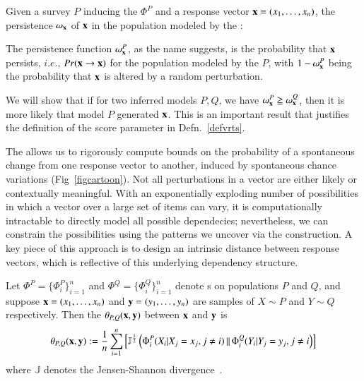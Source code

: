 \documentclass[onecolumn,10pt]{IEEEtran}
\begin{document}
% 
\begin{defn}\label{def:mem}
  Given a survey $P$ inducing the \qnet $\Phi^P$ and a response  vector $\bm{\mathrm{x}} = (x_1, \ldots, x_n)$, the persistence $\omega_{\bm{\mathrm{x}}}$ of  $\bm{\mathrm{x}}$ in the population modeled  by the \qnet:
\end{defn}
The persistence function $\omega_{\bm{\mathrm{x}}}^P$, as the name suggests,  is the probability that $\bm{\mathrm{x}}$ persists, $i.e.$,  $Pr(\bm{\mathrm{x}} \rightarrow \bm{\mathrm{x}})$ for the population modeled by the \qnet $P$, with $1-\omega_{\bm{\mathrm{x}}}^P$ being the probability that $\bm{\mathrm{x}}$ is altered by a  random perturbation.

We will show  that if for two inferred \qnet models $P,Q$, we have $\omega_{\bm{\mathrm{x}}}^P \geqq \omega_{\bm{\mathrm{x}}}^Q$, then it is more likely that model $P$ generated $\bm{\mathrm{x}}$. This is an important result that justifies the definition of the
score parameter in Defn.~\ref{defvrts}.



The \qnet allows us to rigorously compute  bounds on  the probability of a spontaneous change from one response vector to another, induced by spontaneous chance variations (Fig~\ref{figcartoon}). Not all perturbations in a vector are either likely or contextually meaningful. With an exponentially exploding number of possibilities in which a vector over a large set of items can vary, it is computationally intractable to directly model all possible dependecies; nevertheless, we can constrain the possibilities using the patterns we uncover via the \qnet construction.  A key piece of this approach is to design  an intrinsic distance between response vectors, which is reflective of this underlying  dependency structure.  

\begin{defn}[\qdist]
  \label{defqdistance} 
  Let $\Phi^P = \{\Phi_i^P\}_{i=1}^n$ and $\Phi^Q = \{\Phi_i^Q\}_{i=1}^n$ denote {\qnet}s on populations $P$ and $Q$, and suppose $\bm{\mathrm{x}}=(x_1, \ldots, x_n)$ and $\bm{\mathrm{y}} =(y_1, \ldots, y_n)$ are samples of $X \sim P$ and $Y \sim Q$ respectively. Then the \qdist $\theta_{P,Q}(\bm{\mathrm{x}},\bm{\mathrm{y}})$ between $\bm{\mathrm{x}}$ and $\bm{\mathrm{y}}$ is\[\theta_{P,Q}(\bm{\mathrm{x}},\bm{\mathrm{y}}) := \frac{1}{n}\sum_{i=1}^n \left[ \mathbb{J}^{\frac{1}{2}} \left(\Phi_i^P(X_i |X_j = x_j, j \neq i) \,\|\, \Phi_i^Q(Y_i|Y_j = y_j, j \neq i\right ) \right]\]%
  where $\mathbb{J}$ denotes the Jensen-Shannon divergence~\cite{cover}.
\end{defn}
\end{document}
